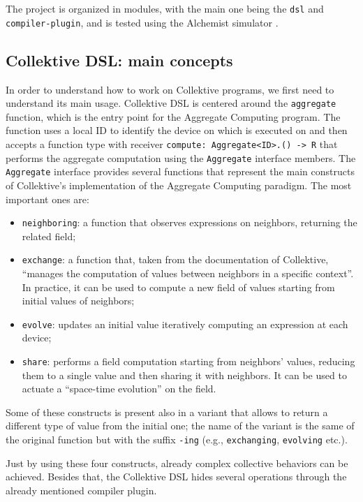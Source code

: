 \documentclass[12pt,a4paper,openright,twoside]{book}
\begin{document}
The project is organized in modules, with the main one being the \lstinline{dsl}
and \lstinline{compiler-plugin}, and is tested using the Alchemist simulator
\cite{DBLP:journals/jos/PianiniMV13}. 

\subsection{Collektive DSL: main concepts} \label{sec:collektive-dsl}

In order to understand how to work on Collektive programs, we first need to
understand its main usage. Collektive DSL is centered around the
\lstinline{aggregate} function, which is the entry point for the Aggregate
Computing program. The function uses a local ID to identify the device on which
is executed on and then accepts a function type with receiver
\lstinline{compute: Aggregate<ID>.() -> R} that performs the aggregate
computation using the \lstinline{Aggregate} interface members.
%
The \lstinline{Aggregate} interface provides several functions that represent
the main constructs of Collektive's implementation of the Aggregate Computing
paradigm. The most important ones are:
\begin{itemize}
  \item \lstinline{neighboring}: a function that observes expressions on
  neighbors, returning the related field;
  \item \lstinline{exchange}: a function that, taken from the documentation of
  Collektive, ``manages the computation of values between neighbors in a
  specific context''. In practice, it can be used to compute a new field of 
  values starting from initial values of neighbors;
  \item \lstinline{evolve}: updates an initial value iteratively computing an
  expression at each device;
  \item \lstinline{share}: performs a field computation starting from neighbors'
  values, reducing them to a single value and then sharing it with neighbors. 
  It can be used to actuate a ``space-time evolution'' on the field.
\end{itemize}

Some of these constructs is present also in a variant that allows to return a
different type of value from the initial one; the name of the variant is 
the same of the original function but with the suffix \lstinline{-ing} (e.g., 
\lstinline{exchanging}, \lstinline{evolving} etc.).

Just by using these four constructs, already complex collective behaviors can
be achieved. Besides that, the Collektive DSL hides several operations through
the already mentioned compiler plugin. 
\end{document}
